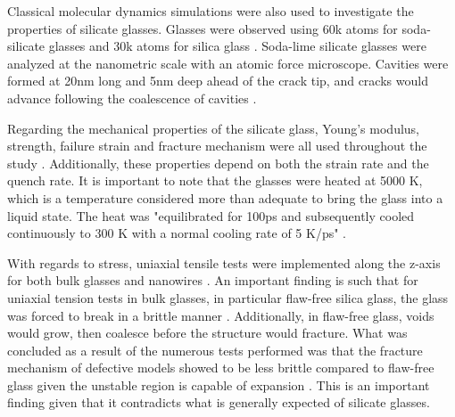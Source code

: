 Classical molecular dynamics simulations were also used to investigate the properties of silicate glasses. Glasses were observed using 60k atoms for soda-silicate glasses and 30k atoms for silica glass \cite{pedone2015dynamics}. Soda-lime silicate glasses were analyzed at the nanometric scale with an atomic force microscope. Cavities were formed at 20nm long and 5nm deep ahead of the crack tip, and cracks would advance following the coalescence of cavities \cite{pedone2015dynamics}.

Regarding the mechanical properties of the silicate glass, Young's modulus, strength, failure strain and fracture mechanism were all used throughout the study \cite{pedone2015dynamics}.  Additionally, these properties depend on both the strain rate and the quench rate. It is important to note that the glasses were heated at 5000 K, which is a temperature considered more than adequate to bring the glass into a liquid state. The heat was "equilibrated for 100ps and subsequently cooled continuously to 300 K with a normal cooling rate of 5 K/ps" \cite{pedone2015dynamics}.

With regards to stress, uniaxial tensile tests were implemented along the z-axis for both bulk glasses and nanowires \cite{pedone2015dynamics}. An important finding is such that for uniaxial tension tests in bulk glasses, in particular flaw-free silica glass, the glass was forced to break in a brittle manner \cite{pedone2015dynamics}. Additionally, in flaw-free glass, voids would grow, then coalesce before the structure would fracture. What was concluded as a result of the numerous tests performed was that the fracture mechanism of defective models showed to be less brittle compared to flaw-free glass given the unstable region is capable of expansion \cite{pedone2015dynamics}. This is an important finding given that it contradicts what is generally expected of silicate glasses.\cite{radialDistribution}



